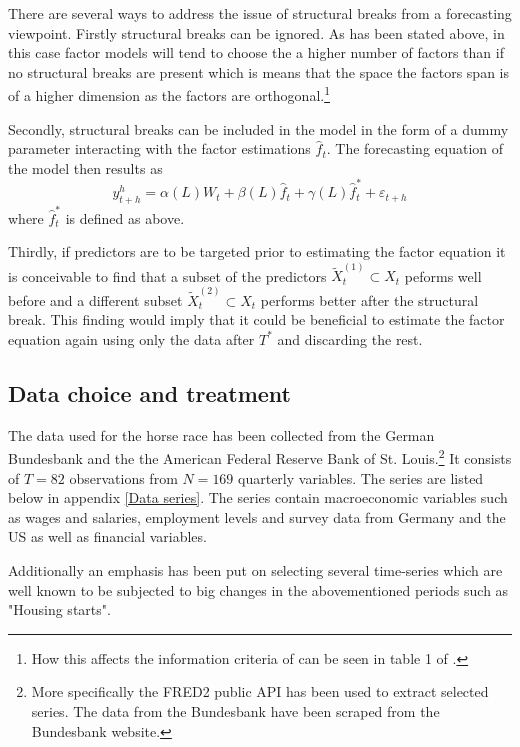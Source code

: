 \documentclass[12pt]{article}
\begin{document}
There are several ways to address the issue of structural breaks from a forecasting viewpoint. Firstly structural breaks can be ignored. As has been stated above, in this case factor models will tend to choose the a higher number of factors than if no structural breaks are present which is means that the space the factors span is of a higher dimension as the factors are orthogonal.\footnote{How this affects the information criteria of \citet{bai2002determining} can be seen in table 1 of \citet{breitung2011testing}.}

Secondly, structural breaks can be included in the model in the form of a dummy parameter interacting with the factor estimations $\hat f_t$. The forecasting equation of the model then results as
\begin{equation}
	\label{forecasting, structural breaks}
	y^h_{t+h} = \alpha(L) W_t + \beta(L) \hat f_t + \gamma(L) \hat f_t^* + \varepsilon_{t+h}
\end{equation}
where $\hat f_t^*$ is defined as above.

Thirdly, if predictors are to be targeted prior to estimating the factor equation it is conceivable to find that a subset of the predictors $\tilde X_t^{(1)} \subset X_t$ peforms well before and a different subset $\tilde X_t^{(2)} \subset X_t$ performs better after the structural break. This finding would imply that it could be beneficial to estimate the factor equation again using only the data after $T^*$ and discarding the rest.


\subsection{Data choice and treatment}
The data used for the horse race has been collected from the German Bundesbank and the the American Federal Reserve Bank of St. Louis.\footnote{More specifically the FRED2 public API has been used to extract selected series. The data from the Bundesbank have been scraped from the Bundesbank website.}  It consists of $T=82$ observations from $N=169$ quarterly variables. The series are listed below in appendix \ref{Data series}. The series contain macroeconomic variables such as wages and salaries, employment levels and survey data from Germany and the US as well as financial variables.

Additionally an emphasis has been put on selecting several time-series which are well known to be subjected to big changes in the abovementioned periods such as "Housing starts".
\end{document}
